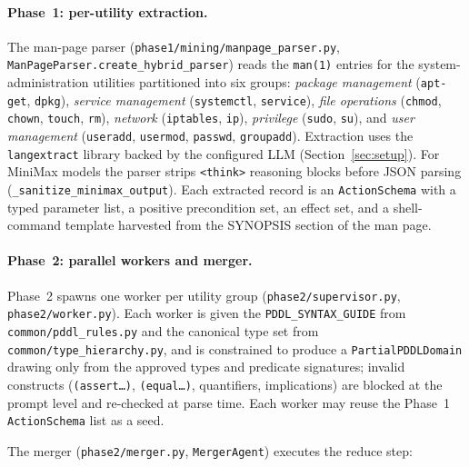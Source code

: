 \paragraph{Phase~1: per-utility extraction.}
The man-page parser (\texttt{phase1/mining/manpage\_parser.py}, \texttt{ManPageParser.create\_hybrid\_parser}) reads the \texttt{man(1)} entries for the system-administration utilities partitioned into six groups: \emph{package management} (\texttt{apt-get}, \texttt{dpkg}), \emph{service management} (\texttt{systemctl}, \texttt{service}), \emph{file operations} (\texttt{chmod}, \texttt{chown}, \texttt{touch}, \texttt{rm}), \emph{network} (\texttt{iptables}, \texttt{ip}), \emph{privilege} (\texttt{sudo}, \texttt{su}), and \emph{user management} (\texttt{useradd}, \texttt{usermod}, \texttt{passwd}, \texttt{groupadd}). Extraction uses the \texttt{langextract} library backed by the configured LLM (Section~\ref{sec:setup}). For MiniMax models the parser strips \texttt{<think>} reasoning blocks before JSON parsing (\texttt{\_sanitize\_minimax\_output}). Each extracted record is an \texttt{ActionSchema} with a typed parameter list, a positive precondition set, an effect set, and a shell-command template harvested from the SYNOPSIS section of the man page.

\paragraph{Phase~2: parallel workers and merger.}
Phase~2 spawns one worker per utility group (\texttt{phase2/supervisor.py}, \texttt{phase2/worker.py}). Each worker is given the \texttt{PDDL\_SYNTAX\_GUIDE} from \texttt{common/pddl\_rules.py} and the canonical type set from \texttt{common/type\_hierarchy.py}, and is constrained to produce a \texttt{PartialPDDLDomain} drawing only from the approved types and predicate signatures; invalid constructs (\texttt{(assert\dots)}, \texttt{(equal\dots)}, quantifiers, implications) are blocked at the prompt level and re-checked at parse time. Each worker may reuse the Phase~1 \texttt{ActionSchema} list as a seed.

The merger (\texttt{phase2/merger.py}, \texttt{MergerAgent}) executes the reduce step:

